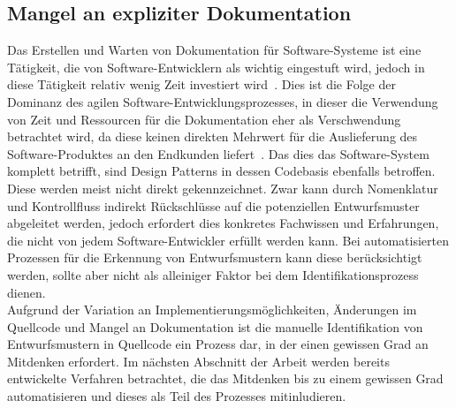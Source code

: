 \subsection*{Mangel an expliziter Dokumentation}

Das Erstellen und Warten von Dokumentation für Software-Systeme ist eine Tätigkeit, die von Software-Entwicklern als wichtig eingestuft wird, jedoch in diese Tätigkeit relativ wenig Zeit investiert wird~\cite[S, 162]{zhi2015cost}.
Dies ist die Folge der Dominanz des agilen Software-Entwicklungsprozesses, in dieser die Verwendung von Zeit und Ressourcen für die Dokumentation eher als Verschwendung betrachtet wird, da diese keinen direkten Mehrwert für die Auslieferung des Software-Produktes an den Endkunden liefert~\cite[S. 159]{zhi2015cost}.
Das dies das Software-System komplett betrifft, sind Design Patterns in dessen Codebasis ebenfalls betroffen. Diese werden meist nicht direkt gekennzeichnet. 
Zwar kann durch Nomenklatur und Kontrollfluss indirekt Rückschlüsse auf die potenziellen Entwurfsmuster abgeleitet werden, jedoch erfordert dies konkretes Fachwissen und Erfahrungen, die nicht von jedem Software-Entwickler erfüllt werden kann.
Bei automatisierten Prozessen für die Erkennung von Entwurfsmustern kann diese berücksichtigt werden, sollte aber nicht als alleiniger Faktor bei dem Identifikationsprozess dienen.\\

Aufgrund der Variation an Implementierungsmöglichkeiten, Änderungen im Quellcode und Mangel an Dokumentation ist die manuelle Identifikation von Entwurfsmustern in Quellcode ein Prozess dar,
in der einen gewissen Grad an Mitdenken erfordert. Im nächsten Abschnitt der Arbeit werden bereits entwickelte Verfahren betrachtet, die das Mitdenken bis zu einem gewissen Grad automatisieren und dieses als Teil des Prozesses mitinludieren.




